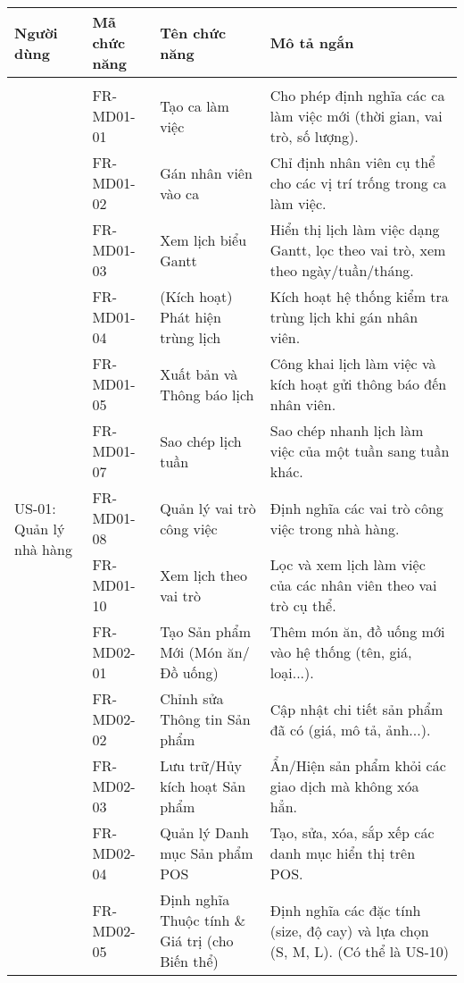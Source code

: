 \newpage %



\begin{longtable}{|m{2.5cm}|m{2.5cm}|m{5cm}|m{5cm}|}
\hline
\textbf{Người dùng} & \textbf{Mã chức năng} & \textbf{Tên chức năng} & \textbf{Mô tả ngắn} \\
\hline
\endhead %

\midrule
\endfoot %

\bottomrule
\endlastfoot %

\multicolumn{4}{|l|}{\textbf{US-01: Quản lý nhà hàng}} \\ \hline
\multirow{15}{=}[2pt]{US-01: Quản lý nhà hàng} & FR-MD01-01 & Tạo ca làm việc & Cho phép định nghĩa các ca làm việc mới (thời gian, vai trò, số lượng). \\
& FR-MD01-02 & Gán nhân viên vào ca & Chỉ định nhân viên cụ thể cho các vị trí trống trong ca làm việc. \\
& FR-MD01-03 & Xem lịch biểu Gantt & Hiển thị lịch làm việc dạng Gantt, lọc theo vai trò, xem theo ngày/tuần/tháng. \\
& FR-MD01-04 & (Kích hoạt) Phát hiện trùng lịch & Kích hoạt hệ thống kiểm tra trùng lịch khi gán nhân viên. \\
& FR-MD01-05 & Xuất bản và Thông báo lịch & Công khai lịch làm việc và kích hoạt gửi thông báo đến nhân viên. \\
& FR-MD01-07 & Sao chép lịch tuần & Sao chép nhanh lịch làm việc của một tuần sang tuần khác. \\
& FR-MD01-08 & Quản lý vai trò công việc & Định nghĩa các vai trò công việc trong nhà hàng. \\
& FR-MD01-10 & Xem lịch theo vai trò & Lọc và xem lịch làm việc của các nhân viên theo vai trò cụ thể. \\ \cline{2-4}
& FR-MD02-01 & Tạo Sản phẩm Mới (Món ăn/Đồ uống) & Thêm món ăn, đồ uống mới vào hệ thống (tên, giá, loại...). \\
& FR-MD02-02 & Chỉnh sửa Thông tin Sản phẩm & Cập nhật chi tiết sản phẩm đã có (giá, mô tả, ảnh...). \\
& FR-MD02-03 & Lưu trữ/Hủy kích hoạt Sản phẩm & Ẩn/Hiện sản phẩm khỏi các giao dịch mà không xóa hẳn. \\
& FR-MD02-04 & Quản lý Danh mục Sản phẩm POS & Tạo, sửa, xóa, sắp xếp các danh mục hiển thị trên POS. \\
& FR-MD02-05 & Định nghĩa Thuộc tính \& Giá trị (cho Biến thể) & Định nghĩa các đặc tính (size, độ cay) và lựa chọn (S, M, L). (Có thể là US-10) \\

\end{longtable}
